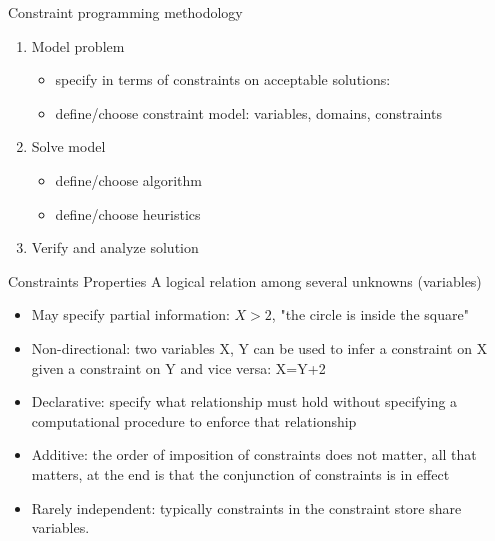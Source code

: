\begin{frame}[plain]{Constraint programming methodology}
 
\begin{enumerate}
 \item Model problem
\begin{itemize}
 \item specify in terms of constraints on acceptable solutions: %
\item define/choose constraint model:  \color{blue}variables, domains, constraints\color{black}
\end{itemize}

\item Solve model
\begin{itemize}
 \item define/choose algorithm
\item define/choose heuristics
\end{itemize}

\item Verify and analyze solution
\end{enumerate}
\begin{block}{Constraints Properties}
\alert{A logical relation among several unknowns (variables)}

\begin{itemize}
 \item May specify \color{blue}partial information\color{black}: $X > 2$, "the circle is inside the square"
\item \color{blue}Non-directional\color{black}: two variables X, Y can be used to infer a constraint on X given a constraint on Y and vice versa: X=Y+2
\item \color{blue}Declarative\color{black}: specify what relationship must hold without specifying a computational procedure to enforce that relationship
\item \color{blue}Additive\color{black}: the order of imposition of constraints does not matter, all that matters, at the end is that the conjunction of constraints is in effect
\item \color{blue}Rarely independent\color{black}: typically constraints in the constraint store share variables.
\end{itemize}

\end{block}
\end{frame}



